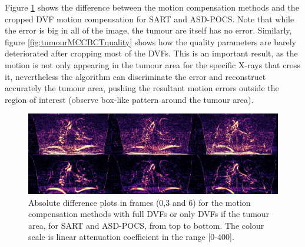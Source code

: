 Figure \ref{fig:tumourMCCBCT3static} shows the difference between the motion compensation methods and the cropped DVF motion compensation for SART and ASD-POCS. Note that while the error is big in all of the image, the tumour are itself has no error. Similarly, figure \ref{fig:tumourMCCBCTquality} shows how the quality parameters are barely deteriorated after cropping most of the DVFs. This is an important result, as the motion is not only appearing in the tumour area for the specific X-rays that cross it, nevertheless the algorithm can discriminate the error and reconstruct accurately the tumour area, pushing the resultant motion errors outside the region of interest (observe box-like pattern around the tumour area).



\begin{figure}
\begin{center}

\includegraphics[width=\textwidth]{accuracyMC/difftumourMCCBCT3stage.png} 


\end{center}

\caption[Three difference frames of the  motion compensation methods with DVFs only in the tumour]{\label{fig:tumourMCCBCT3static} Absolute difference plots in frames (0,3 and 6) for the motion compensation methods with full DVFs or only DVFs if the tumour area, for SART and ASD-POCS, from top to bottom.  The colour scale is linear attenuation coefficient in the range [0-400].} 

\end{figure}



